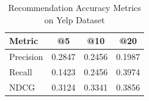 \begin{table}[h]
\centering
\caption{Recommendation Accuracy Metrics on Yelp Dataset}
\label{tab:accuracy}
\begin{tabular}{lccc}
\toprule
\textbf{Metric} & \textbf{@5} & \textbf{@10} & \textbf{@20} \\
\midrule
Precision & 0.2847 & 0.2456 & 0.1987 \\
Recall & 0.1423 & 0.2456 & 0.3974 \\
NDCG & 0.3124 & 0.3341 & 0.3856 \\
\bottomrule
\end{tabular}
\end{table}
